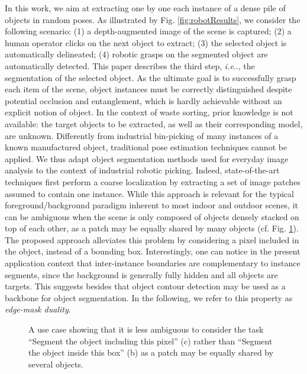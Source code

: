 \documentclass[runningheads,a4paper]{llncs}
\makeatletter
\DeclareRobustCommand\onedot{\futurelet\@let@token\@onedot}
\newcommand*\@onedot{\ifx\@let@token.\else.\null\fi\xspace}
\newcommand*\ie{\emph{i.e}\onedot} \newcommand*\Ie{\emph{I.e}\onedot}
\newlength\mywidth
\makeatother
\begin{document}
In this work, we aim at extracting one by one each instance of a dense pile of objects in random poses. As illustrated by Fig. \ref{fig:robotResults}, we consider the following scenario: (1) a depth-augmented image of the scene is captured; (2) a human operator clicks on the next object to extract; (3) the selected object is automatically delineated; (4) robotic grasps on the segmented object are automatically detected. This paper describes the third step, \ie, the segmentation of the selected object. As the ultimate goal is to successfully grasp each item of the scene, object instances must be correctly distinguished despite potential occlusion and entanglement, which is hardly achievable without an explicit notion of object. In the context of waste sorting, prior knowledge is not available: the target objects to be extracted, as well as their corresponding model, are unknown. Differently from industrial bin-picking of many instances of a known manufactured object, traditional pose estimation techniques \cite{ChoiTTLR12} cannot be applied. We thus adapt object segmentation methods used for everyday image analysis to the context of industrial robotic picking. Indeed, state-of-the-art techniques \cite{MaskRCNN, SharpMask} first perform a coarse localization by extracting a set of image patches assumed to contain one instance. While this approach is relevant for the typical foreground/background paradigm inherent to most indoor and outdoor scenes, it can be ambiguous when the scene is only composed of objects densely stacked on top of each other, as a patch may be equally shared by many objects (cf. Fig. \ref{fig:patchVsSeed}). The proposed approach alleviates this problem by considering a pixel included in the object, instead of a bounding box. Interestingly, one can notice in the present application context that inter-instance boundaries are complementary to instance segments, since the background is generally fully hidden and all objects are targets. This suggests besides that object contour detection may be used as a backbone for object segmentation. In the following, we refer to this property as \emph{edge-mask duality}.

\begin{figure}[h!]
\centering
\setlength{\mywidth}{.28\linewidth}
\quad
{}\quad
{}
\caption{A use case showing that it is less ambiguous to consider the task ``Segment the object including this pixel'' (c) rather than ``Segment the object inside this box'' (b) as a patch may be equally shared by several objects.}
\label{fig:patchVsSeed}
\end{figure}
\end{document}
